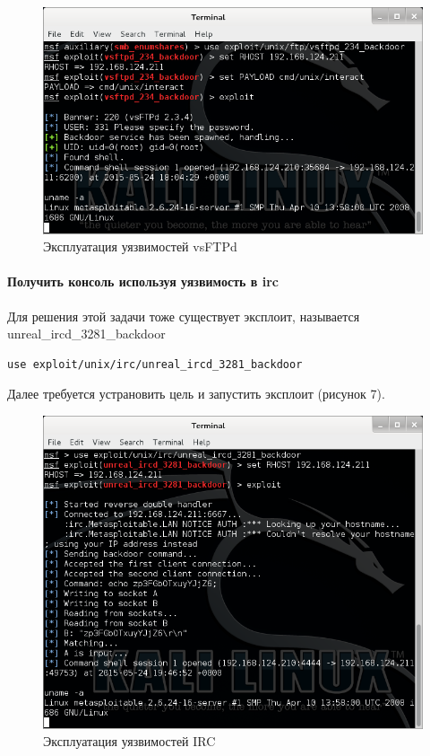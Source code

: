 \begin{figure}[h!]
\centering
\includegraphics[scale=0.95]{res/pic06}
\caption{Эксплуатация уязвимостей vsFTPd}
\end{figure}

\paragraph{Получить консоль используя уязвимость в irc}

Для решения этой задачи тоже существует эксплоит, называется unreal\_ircd\_3281\_backdoor

\begin{Verbatim}[frame=single]
use exploit/unix/irc/unreal_ircd_3281_backdoor
\end{Verbatim}

Далее требуется устрановить цель и запустить эксплоит (рисунок 7).

\begin{figure}[h!]
\centering
\includegraphics[scale=0.75]{res/pic07}
\caption{Эксплуатация уязвимостей IRC}
\end{figure}

